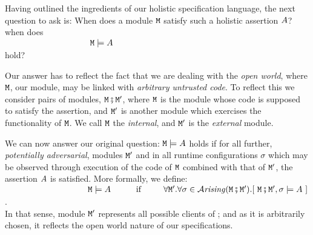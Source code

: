 
Having outlined the ingredients of our holistic specification language, the next question to ask is: When does a module 
${\mbox{\tt{\ensuremath{{\mbox{\tt{M}}}}}}}$ satisfy such a holistic assertion $A$? 
 when does  \\
$~ \strut  \hspace{1.3in}\ {\mbox{\tt{\ensuremath{{\mbox{\tt{M}}}}}}} \models A$ \\
hold? 
   
Our  answer has to reflect the fact that we are dealing with the 
\emph{open  world},  where  ${\mbox{\tt{\ensuremath{{\mbox{\tt{M}}}}}}}$, our module, may be
linked with \textit{arbitrary untrusted code}. To reflect this we consider
 pairs of modules, 
${\mbox{\tt{\ensuremath{{\mbox{\tt{M}}}}}}} \fatsemi {{\mbox{\tt{\ensuremath{{\mbox{\tt{M}}}}}}}'}$,  where ${\mbox{\tt{\ensuremath{{\mbox{\tt{M}}}}}}}$ is the module 
whose code is supposed to satisfy the assertion,
and ${\mbox{\tt{\ensuremath{{\mbox{\tt{M}}}}}}}'$  is  another %
 module which exercises
the functionality of ${\mbox{\tt{\ensuremath{{\mbox{\tt{M}}}}}}}$. We call ${\mbox{\tt{\ensuremath{{\mbox{\tt{M}}}}}}}$ the {\em internal}, and ${\mbox{\tt{\ensuremath{{\mbox{\tt{M}}}}}}}'$ is the {\em external} module.
    
We can now answer our original question: ${\mbox{\tt{\ensuremath{{\mbox{\tt{M}}}}}}} \models A$ 
 holds if for all further, {\em potentially adversarial}, modules ${\mbox{\tt{\ensuremath{{\mbox{\tt{M}}}}}}}'$ and in  all runtime configurations $\sigma$ which may be observed through execution of the code of ${\mbox{\tt{\ensuremath{{\mbox{\tt{M}}}}}}}$ combined with that of ${\mbox{\tt{\ensuremath{{\mbox{\tt{M}}}}}}}'$, the assertion $A$ is satisfied. More formally, we define:\\
$~ \strut  \hspace{1.3in} \M \models \A \ \ \  \ \ \ \ \ \mbox{
if               } \ \ \  \ \ \  \  \forall \M'.\forall \sigma\in\Arising
{\M \mkpair  {\M'}}. [\ \M \mkpair  {\M'},\sigma \models \A\ ]$.  \\
In that sense, module ${\mbox{\tt{\ensuremath{{\mbox{\tt{M}}}}}}}'$ represents all possible clients of {\M}; and as it is arbitrarily chosen, it reflects the open world nature of our specifications.%
{}

